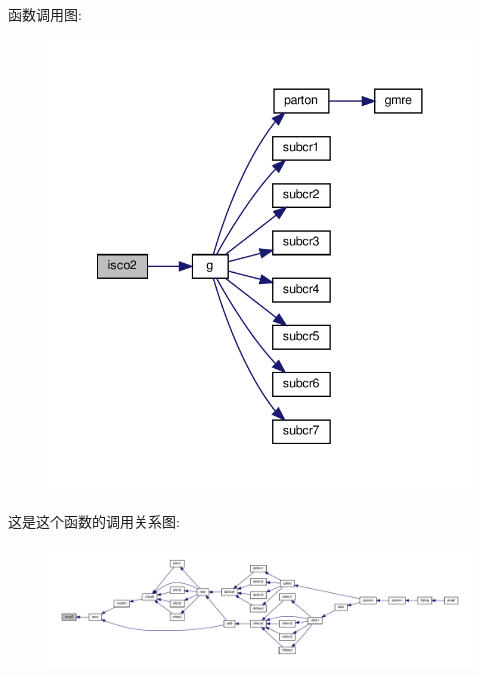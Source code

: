 函数调用图\+:
\nopagebreak
\begin{figure}[H]
\begin{center}
\leavevmode
\includegraphics[width=341pt]{isco2_8f90_a9ac5e001d213ecfc71a7b6d8a3b8a69d_cgraph}
\end{center}
\end{figure}
这是这个函数的调用关系图\+:
\nopagebreak
\begin{figure}[H]
\begin{center}
\leavevmode
\includegraphics[width=350pt]{isco2_8f90_a9ac5e001d213ecfc71a7b6d8a3b8a69d_icgraph}
\end{center}
\end{figure}
